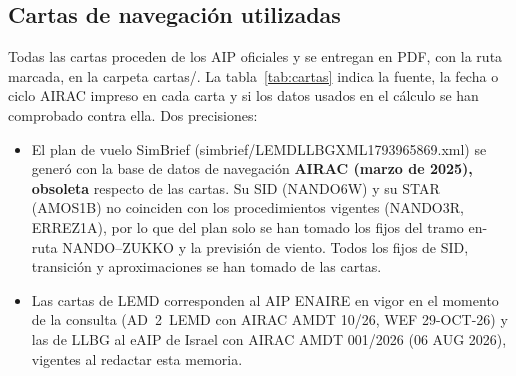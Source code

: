 \documentclass[11pt,a4paper]{article}
\DeclareRobustCommand{\m}[1]{{\ttfamily\def\_{\textunderscore\penalty100\relax}#1}}
\begin{document}
\subsection{Cartas de navegación utilizadas}

Todas las cartas proceden de los AIP oficiales y se entregan en PDF, con la ruta marcada, en la carpeta \m{cartas/}. La tabla~\ref{tab:cartas} indica la fuente, la fecha o ciclo AIRAC impreso en cada carta y si los datos usados en el cálculo se han comprobado contra ella. Dos precisiones:
\begin{itemize}
\item El plan de vuelo SimBrief (\m{simbrief/LEMDLLBG\_XML\_1793965869.xml}) se generó con la base de datos de navegación \textbf{AIRAC \sbAirac{} (marzo de 2025), obsoleta} respecto de las cartas. Su SID (NANDO6W) y su STAR (AMOS1B) no coinciden con los procedimientos vigentes (NANDO3R, ERREZ1A), por lo que del plan solo se han tomado los fijos del tramo en-ruta NANDO--ZUKKO y la previsión de viento. Todos los fijos de SID, transición y aproximaciones se han tomado de las cartas.
\item Las cartas de LEMD corresponden al AIP ENAIRE en vigor en el momento de la consulta (AD~2~LEMD con AIRAC AMDT 10/26, WEF 29-OCT-26) y las de LLBG al eAIP de Israel con AIRAC AMDT 001/2026 (06 AUG 2026), vigentes al redactar esta memoria.
\end{itemize}
\end{document}
